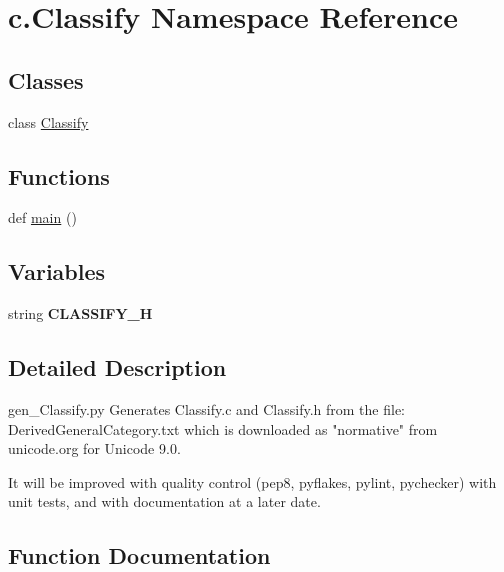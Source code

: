 \hypertarget{namespacec_1_1_classify}{}\section{c.\+Classify Namespace Reference}
\label{namespacec_1_1_classify}
\subsection*{Classes}
\begin{DoxyCompactItemize}
\item 
class \hyperlink{classc_1_1_classify_1_1_classify}{Classify}
\end{DoxyCompactItemize}
\subsection*{Functions}
\begin{DoxyCompactItemize}
\item 
def \hyperlink{namespacec_1_1_classify_a8a2d3fadfd6b3845dfa86c094523cebb}{main} ()
\end{DoxyCompactItemize}
\subsection*{Variables}
\begin{DoxyCompactItemize}
\item 
string {\bfseries C\+L\+A\+S\+S\+I\+F\+Y\+\_\+H}\hypertarget{namespacec_1_1_classify_abc6032a3b7c7f69bc0404ad587399031}{}\label{namespacec_1_1_classify_abc6032a3b7c7f69bc0404ad587399031}

\end{DoxyCompactItemize}


\subsection{Detailed Description}
\begin{DoxyVerb}gen_Classify.py
Generates Classify.c and Classify.h from the file: DerivedGeneralCategory.txt
which is downloaded as "normative" from unicode.org for Unicode 9.0.

It will be improved with quality control (pep8, pyflakes, pylint, pychecker)
with unit tests, and with documentation at a later date.
\end{DoxyVerb}
 

\subsection{Function Documentation}
